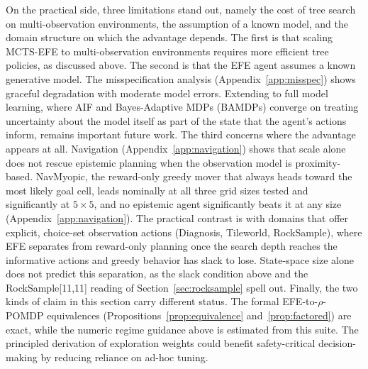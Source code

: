 On the practical side, three limitations stand out, namely the cost of tree search on multi-observation environments, the assumption of a known model, and the domain structure on which the advantage depends. The first is that scaling MCTS-EFE to multi-observation environments requires more efficient tree policies, as discussed above. The second is that the EFE agent assumes a known generative model. The misspecification analysis (Appendix~\ref{app:misspec}) shows graceful degradation with moderate model errors. Extending to full model learning, where AIF and Bayes-Adaptive MDPs (BAMDPs) converge on treating uncertainty about the model itself as part of the state that the agent's actions inform, remains important future work. The third concerns where the advantage appears at all. Navigation (Appendix~\ref{app:navigation}) shows that scale alone does not rescue epistemic planning when the observation model is proximity-based. NavMyopic, the reward-only greedy mover that always heads toward the most likely goal cell, leads nominally at all three grid sizes tested and significantly at $5{\times}5$, and no epistemic agent significantly beats it at any size (Appendix~\ref{app:navigation}). The practical contrast is with domains that offer explicit, choice-set observation actions (Diagnosis, Tileworld, RockSample), where EFE separates from reward-only planning once the search depth reaches the informative actions and greedy behavior has slack to lose. State-space size alone does not predict this separation, as the slack condition above and the RockSample[11,11] reading of Section~\ref{sec:rocksample} spell out. Finally, the two kinds of claim in this section carry different status. The formal EFE-to-$\rho$-POMDP equivalences (Propositions~\ref{prop:equivalence} and~\ref{prop:factored}) are exact, while the numeric regime guidance above is estimated from this suite. The principled derivation of exploration weights could benefit safety-critical decision-making by reducing reliance on ad-hoc tuning.
